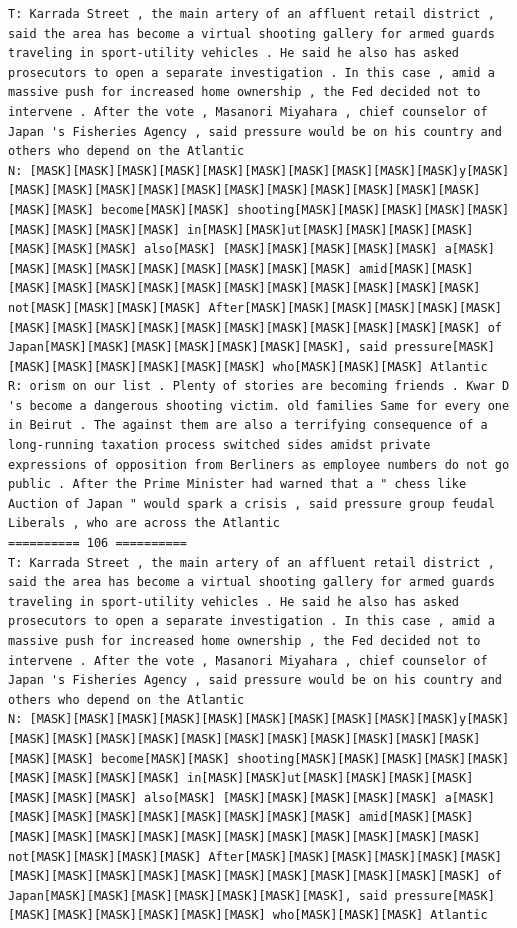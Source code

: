 \begin{lstlisting}
T: Karrada Street , the main artery of an affluent retail district , said the area has become a virtual shooting gallery for armed guards traveling in sport-utility vehicles . He said he also has asked prosecutors to open a separate investigation . In this case , amid a massive push for increased home ownership , the Fed decided not to intervene . After the vote , Masanori Miyahara , chief counselor of Japan 's Fisheries Agency , said pressure would be on his country and others who depend on the Atlantic
N: [MASK][MASK][MASK][MASK][MASK][MASK][MASK][MASK][MASK][MASK]y[MASK][MASK][MASK][MASK][MASK][MASK][MASK][MASK][MASK][MASK][MASK][MASK][MASK][MASK] become[MASK][MASK] shooting[MASK][MASK][MASK][MASK][MASK][MASK][MASK][MASK][MASK] in[MASK][MASK]ut[MASK][MASK][MASK][MASK][MASK][MASK][MASK] also[MASK] [MASK][MASK][MASK][MASK][MASK] a[MASK][MASK][MASK][MASK][MASK][MASK][MASK][MASK][MASK] amid[MASK][MASK][MASK][MASK][MASK][MASK][MASK][MASK][MASK][MASK][MASK][MASK][MASK] not[MASK][MASK][MASK][MASK] After[MASK][MASK][MASK][MASK][MASK][MASK][MASK][MASK][MASK][MASK][MASK][MASK][MASK][MASK][MASK][MASK][MASK] of Japan[MASK][MASK][MASK][MASK][MASK][MASK][MASK], said pressure[MASK][MASK][MASK][MASK][MASK][MASK][MASK] who[MASK][MASK][MASK] Atlantic
R: orism on our list . Plenty of stories are becoming friends . Kwar D 's become a dangerous shooting victim. old families Same for every one in Beirut . The against them are also a terrifying consequence of a long-running taxation process switched sides amidst private expressions of opposition from Berliners as employee numbers do not go public . After the Prime Minister had warned that a " chess like Auction of Japan " would spark a crisis , said pressure group feudal Liberals , who are across the Atlantic
========== 106 ==========
T: Karrada Street , the main artery of an affluent retail district , said the area has become a virtual shooting gallery for armed guards traveling in sport-utility vehicles . He said he also has asked prosecutors to open a separate investigation . In this case , amid a massive push for increased home ownership , the Fed decided not to intervene . After the vote , Masanori Miyahara , chief counselor of Japan 's Fisheries Agency , said pressure would be on his country and others who depend on the Atlantic
N: [MASK][MASK][MASK][MASK][MASK][MASK][MASK][MASK][MASK][MASK]y[MASK][MASK][MASK][MASK][MASK][MASK][MASK][MASK][MASK][MASK][MASK][MASK][MASK][MASK] become[MASK][MASK] shooting[MASK][MASK][MASK][MASK][MASK][MASK][MASK][MASK][MASK] in[MASK][MASK]ut[MASK][MASK][MASK][MASK][MASK][MASK][MASK] also[MASK] [MASK][MASK][MASK][MASK][MASK] a[MASK][MASK][MASK][MASK][MASK][MASK][MASK][MASK][MASK] amid[MASK][MASK][MASK][MASK][MASK][MASK][MASK][MASK][MASK][MASK][MASK][MASK][MASK] not[MASK][MASK][MASK][MASK] After[MASK][MASK][MASK][MASK][MASK][MASK][MASK][MASK][MASK][MASK][MASK][MASK][MASK][MASK][MASK][MASK][MASK] of Japan[MASK][MASK][MASK][MASK][MASK][MASK][MASK], said pressure[MASK][MASK][MASK][MASK][MASK][MASK][MASK] who[MASK][MASK][MASK] Atlantic

\end{lstlisting}
